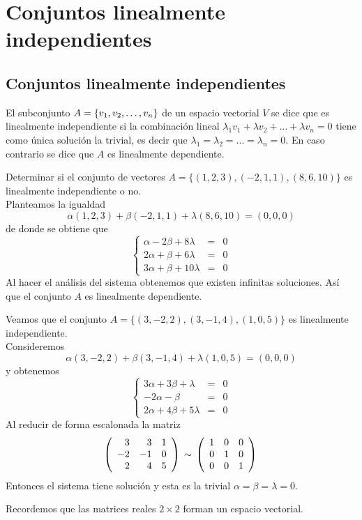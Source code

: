\chapter{Conjuntos linealmente independientes}

\section{Conjuntos linealmente independientes}
El subconjunto $A=  \lbrace v_1, v_2, \ldots, v_n \rbrace$ de un espacio vectorial $V$ se dice que es linealmente independiente si la combinación lineal $\lambda_1 v_1 + \lambda v_2 + \ldots + \lambda v_n = 0$ tiene como única solución la trivial, es decir que $\lambda_1 = \lambda_2 = \ldots = \lambda_n = 0$. En caso contrario se dice que $A$ es linealmente dependiente.

\begin{ejemplo}
Determinar si el conjunto de vectores $A= \{(1,2,3),(-2,1,1),(8,6,10)\}$ es linealmente independiente o no.\\
Planteamos la igualdad 
$$\alpha (1,2,3) + \beta (-2,1,1) + \lambda (8,6,10) = (0,0,0)$$
de donde se obtiene que 
$$\left\{
\begin{array}{rcl}
\alpha - 2\beta +8 \lambda & = & 0\\
2 \alpha + \beta + 6\lambda & = & 0\\
3\alpha + \beta + 10 \lambda & = & 0
\end{array}
\right.$$
Al hacer el análisis del sistema obtenemos que existen infinitas soluciones. Así que el conjunto $A$ es linealmente dependiente.
\end{ejemplo}

\begin{ejemplo}
Veamos que el conjunto $A= \{(3,-2,2),(3,-1,4),(1,0,5)\}$ es linealmente independiente.\\
Consideremos $$\alpha (3,-2,2) + \beta (3,-1,4) + \lambda (1,0,5) = (0,0,0)$$
y obtenemos
$$\left\{
\begin{array}{rcl}
3 \alpha + 3 \beta + \lambda & = & 0\\
-2 \alpha - \beta & = &0\\
2 \alpha +4 \beta +5 \lambda & = & 0

\end{array}
\right.$$
Al reducir de forma escalonada la matriz
$$\left(
\begin{array}{rrr}
3 & 3 & 1\\
-2 & -1 & 0\\
2 & 4 & 5
\end{array}
\right)\\
\sim \\
\left(
\begin{array}{rrr}
1 & 0 & 0\\
0 & 1 &0\\
0 &0 &1
\end{array}
\right)\\$$
Entonces el sistema tiene solución y esta es la trivial $\alpha = \beta = \lambda = 0$.
\end{ejemplo}
Recordemos que las matrices reales $2 \times 2$ forman un espacio vectorial.

